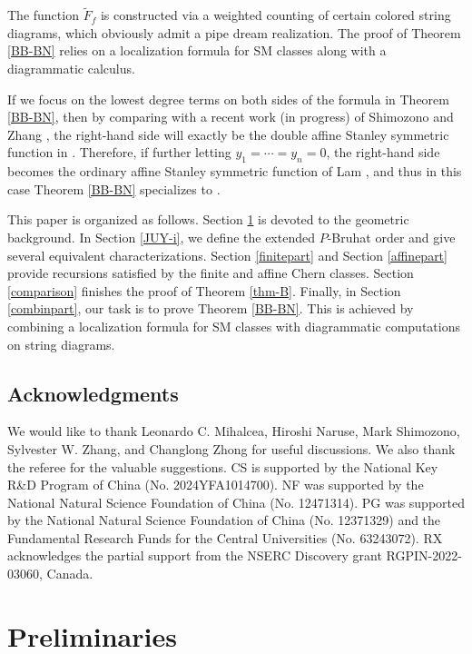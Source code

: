 \documentclass[12pt]{amsart}
\begin{document}
The function $\tilde{F}_f$ is constructed via a weighted counting of certain colored string diagrams, which obviously admit a pipe dream realization. 
The proof of Theorem \ref{BB-BN} relies on a localization formula for SM classes along with  a diagrammatic calculus.

If we focus on the lowest degree terms on both sides of the formula in Theorem \ref{BB-BN}, then by comparing   with a recent  work (in progress) of Shimozono and Zhang \cite{SZ2025}, the right-hand side will exactly be 
the double affine Stanley symmetric function in \cite{LLS21}.
Therefore, if further letting $y_1=\cdots=y_n=0$, the right-hand side becomes the ordinary 
affine Stanley symmetric function of Lam \cite{Lam06}, and thus in this case Theorem \ref{BB-BN} specializes to  \cite[Theorem 7.1]{KLS-Posi}. 


This paper is organized  as follows. Section \ref{OKUY} is devoted to the geometric background. In Section  \ref{JUY-i}, we define the extended $P$-Bruhat order and give several equivalent characterizations. 
Section \ref{finitepart} and Section \ref{affinepart} provide recursions satisfied by the finite and affine Chern classes.
Section \ref{comparison} finishes the proof of Theorem \ref{thm-B}. Finally, in Section \ref{combinpart}, our task is to prove Theorem 
\ref{BB-BN}. This is achieved by combining a localization formula for SM classes with diagrammatic computations on string diagrams.



\subsection*{Acknowledgments}
We would like to thank Leonardo C. Mihalcea, Hiroshi Naruse, Mark Shimozono, Sylvester W. Zhang, and Changlong Zhong for useful discussions. We also thank the referee for the valuable suggestions. CS is supported by the National Key R\&D Program of China (No. 2024YFA1014700). NF was supported by the National Natural Science Foundation of China (No. 12471314). PG was supported by the National Natural Science Foundation of
China (No. 12371329) and the Fundamental Research Funds for the Central
Universities (No. 63243072). RX acknowledges the partial support from the NSERC Discovery grant RGPIN-2022-03060, Canada.






\section{Preliminaries}\label{OKUY}
\end{document}
